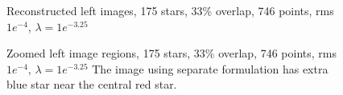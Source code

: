 \begin{enumerate}
\begin{figure}[H]
{		}		
\caption [Reconstructed left images, 175 stars, 33\% overlap, 746 points,  rms $1e^{-4}$, $\lambda = 1e^{-3.25}$]{Reconstructed left images, 175 stars, 33\% overlap, 746 points, rms $1e^{-4}$, $\lambda = 1e^{-3.25}$}
\label{fig:expt15}
\end{figure}
\vspace{-0.2in}
\begin{figure}[H]
\hspace{-0.15in}
		\hspace{-0.15in}
\caption [Zoomed left image regions, 175 stars, 33\% overlap, 746 points,  rms $1e^{-4}$, $\lambda = 1e^{-3.25}$]{Zoomed left image regions, 175 stars, 33\% overlap, 746 points, rms $1e^{-4}$, $\lambda = 1e^{-3.25}$ The image using separate formulation has extra blue star near the central red star.}
\label{fig:expt17}
\end{figure}

\end{enumerate}


